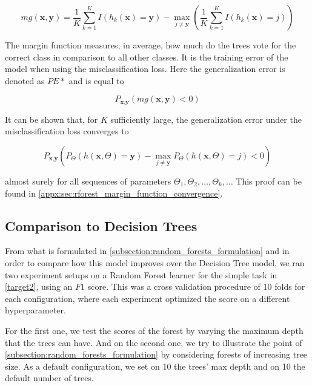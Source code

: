 \begin{equation}
mg(\textbf{x},\textbf{y}) = \frac{1}{K}  \sum_{k=1}^K I(h_k(\textbf{x}) = \textbf{y})
- \max_{j\neq \textbf{y}}\left(\frac{1}{K} \sum_{k=1}^K I(h_k(\textbf{x}) = j) \right)
\end{equation}\label{eq:rf-marginFun}


The margin function measures, in average, how much do the trees vote for the correct class in comparison to all other classes.
It is the training error of the model when using the misclassification loss. 
Here the generalization error is denoted as $PE*$ and is equal to

\begin{equation}
P_{\textbf{x}, \textbf{y} }(mg(\textbf{x},\textbf{y}) <0)
\end{equation}

 It can be shown that, for $K$ sufficiently large, the generalization error under the misclassification loss converges to

\begin{equation}
 P_{\textbf{x}, \textbf{y} } ( P_{\Theta} (h(\textbf{x}, \Theta) = \textbf{y}) - \max_{j \neq \textbf{y}} P_{\Theta} (h(\textbf{x}, \Theta) = j) < 0)
 \end{equation}

almost surely for all sequences of parameters $\Theta_1,\Theta_2, \ldots, \Theta_k,\ldots$
This proof can be found in \cref{appx:sec:rforest_margin_function_convergence}.


\subsection{ Comparison to Decision Trees}\label{subsection:random_forests_comparison_trees}

From what is formulated in \cref{subsection:random_forests_formulation} and in order to compare how this model improves over the Decision Tree model, we ran two experiment setups on a Random Forest learner for the simple task in \cref{target2}, using an $F1$ score. 
This was a cross validation procedure of 10 folds for each configuration, where each experiment optimized the score on a different hyperparameter.

For the first one, we test the scores of the forest by varying the maximum depth that the trees can have.
And on the second one, we try to illustrate the point of \cref{subsection:random_forests_formulation} by considering forests of increasing tree size.
As a default configuration, we set on 10 the trees' max depth and on 10 the default number of trees.

